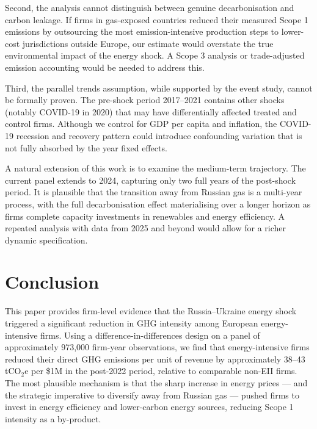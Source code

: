 \documentclass[12pt,a4paper]{article}
\begin{document}
Second, the analysis cannot distinguish between genuine decarbonisation and carbon leakage. If firms in gas-exposed countries reduced their measured Scope 1 emissions by outsourcing the most emission-intensive production steps to lower-cost jurisdictions outside Europe, our estimate would overstate the true environmental impact of the energy shock. A Scope 3 analysis or trade-adjusted emission accounting would be needed to address this.

Third, the parallel trends assumption, while supported by the event study, cannot be formally proven. The pre-shock period 2017–2021 contains other shocks (notably COVID-19 in 2020) that may have differentially affected treated and control firms. Although we control for GDP per capita and inflation, the COVID-19 recession and recovery pattern could introduce confounding variation that is not fully absorbed by the year fixed effects.

A natural extension of this work is to examine the medium-term trajectory. The current panel extends to 2024, capturing only two full years of the post-shock period. It is plausible that the transition away from Russian gas is a multi-year process, with the full decarbonisation effect materialising over a longer horizon as firms complete capacity investments in renewables and energy efficiency. A repeated analysis with data from 2025 and beyond would allow for a richer dynamic specification.

\section{Conclusion}
\label{sec:conclusion}

This paper provides firm-level evidence that the Russia–Ukraine energy shock triggered a significant reduction in GHG intensity among European energy-intensive firms. Using a difference-in-differences design on a panel of approximately 973,000 firm-year observations, we find that energy-intensive firms reduced their direct GHG emissions per unit of revenue by approximately 38--43 tCO$_2$e per \$1M in the post-2022 period, relative to comparable non-EII firms. The most plausible mechanism is that the sharp increase in energy prices — and the strategic imperative to diversify away from Russian gas — pushed firms to invest in energy efficiency and lower-carbon energy sources, reducing Scope 1 intensity as a by-product.
\end{document}

